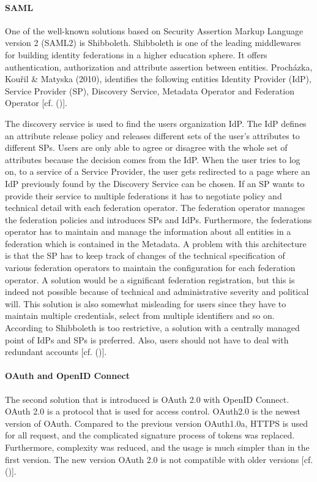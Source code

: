 {{		\paragraph{SAML}
		\label{SAML}
		One of the well-known solutions based on Security Assertion Markup Language version 2 (SAML2) is Shibboleth. Shibboleth is one of the leading middlewares for building identity federations in a higher education sphere. It offers authentication, authorization and attribute assertion between entities. Procházka, Kouřil \& Matyska (2010), identifies the following entities Identity Provider (IdP), Service Provider (SP), Discovery Service, Metadata Operator and Federation Operator  [cf. (\cite{Prochazka:2010:UCA})].
		
		The discovery service is used to find the users organization IdP. The IdP defines an attribute release policy and releases different sets of the user's attributes to different SPs. Users are only able to agree or disagree with the whole set of attributes because the decision comes from the IdP. When the user tries to log on, to a service of a Service Provider, the user gets redirected to a page where an IdP previously found by the Discovery Service can be chosen. If an SP wants to provide their service to multiple federations it has to negotiate policy and technical detail with each federation operator. The federation operator manages the federation policies and introduces SPs and IdPs. Furthermore, the federations operator has to maintain and manage the information about all entities in a federation which is contained in the Metadata. A problem with this architecture is that the SP has to keep track of changes of the technical specification of various federation operators to maintain the configuration for each federation operator. A solution would be a significant federation registration, but this is indeed not possible because of technical and administrative severity and political will. This solution is also somewhat misleading for users since they have to maintain multiple credentials, select from multiple identifiers and so on. According to \cite{Prochazka:2010:UCA} Shibboleth is too restrictive, a solution with a centrally managed point of IdPs and SPs is preferred. Also, users should not have to deal with redundant accounts [cf. (\cite{Prochazka:2010:UCA})].		
		
		\paragraph{OAuth and OpenID Connect}
		\label{OAuthAndOpenID}
		The second solution that is introduced is OAuth 2.0 with OpenID Connect.	OAuth 2.0 is a protocol that is used for access control. OAuth2.0 is the newest version of  OAuth. Compared to the previous version OAuth1.0a, HTTPS is used for all request, and the complicated signature process of tokens was replaced. Furthermore, complexity was reduced, and the usage is much simpler than in the first version. The new version OAuth 2.0 is not compatible with older versions [cf.  (\cite{LeBlanc:2011:SocialApplications})].
		
}}
